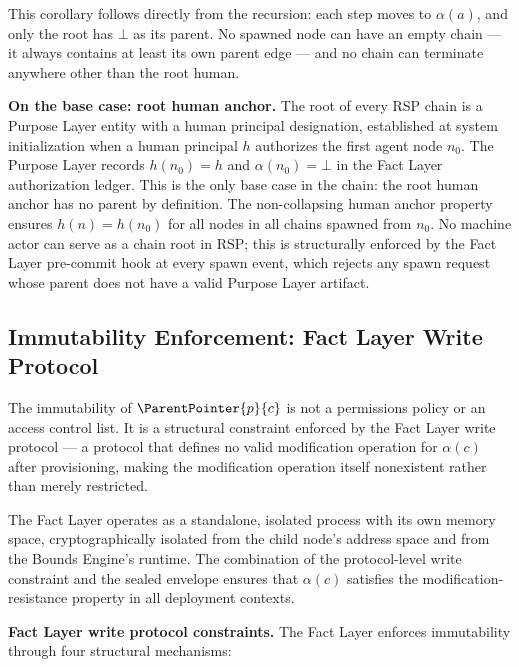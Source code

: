 This corollary follows directly from the recursion: each step moves to $\alpha(a)$, and only the root has $\bot$ as its parent. No spawned node can have an empty chain — it always contains at least its own parent edge — and no chain can terminate anywhere other than the root human.

\begin{note}
\textbf{On the base case: root human anchor.} The root of every RSP chain is a Purpose Layer entity with a human principal designation, established at system initialization when a human principal $h$ authorizes the first agent node $n_0$. The Purpose Layer records $h(n_0) = h$ and $\alpha(n_0) = \bot$ in the Fact Layer authorization ledger. This is the only base case in the chain: the root human anchor has no parent by definition. The non-collapsing human anchor property ensures $h(n) = h(n_0)$ for all nodes in all chains spawned from $n_0$. No machine actor can serve as a chain root in RSP; this is structurally enforced by the Fact Layer pre-commit hook at every spawn event, which rejects any spawn request whose parent does not have a valid Purpose Layer artifact.
\end{note}

\subsection{Immutability Enforcement: Fact Layer Write Protocol}
\label{sec:immutability-enforcement}

The immutability of $\ParentPointer{p}{c}$ is not a permissions policy or an access control list. It is a structural constraint enforced by the Fact Layer write protocol — a protocol that defines no valid modification operation for $\alpha(c)$ after provisioning, making the modification operation itself nonexistent rather than merely restricted.

The Fact Layer operates as a standalone, isolated process with its own memory space, cryptographically isolated from the child node's address space and from the Bounds Engine's runtime. The combination of the protocol-level write constraint and the sealed envelope ensures that $\alpha(c)$ satisfies the modification-resistance property in all deployment contexts.

\medskip
\noindent\textbf{Fact Layer write protocol constraints.} The Fact Layer enforces immutability through four structural mechanisms:

